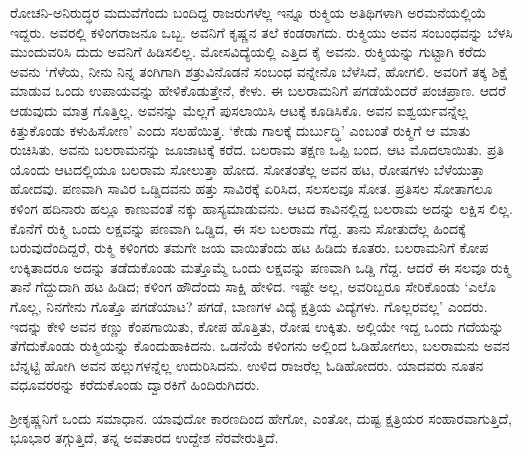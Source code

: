ರೋಚನಿ-ಅನಿರುದ್ಧರ ಮದುವೆಗೆಂದು ಬಂದಿದ್ದ ರಾಜರುಗಳೆಲ್ಲ ಇನ್ನೂ ರುಕ್ಮಿಯ ಅತಿಥಿಗಳಾಗಿ ಅರಮನೆಯಲ್ಲಿಯೆ ಇದ್ದರು. ಅವರಲ್ಲಿ ಕಳಿಂಗರಾಜನೂ ಒಬ್ಬ. ಅವನಿಗೆ ಕೃಷ್ಣನ ತಲೆ ಕಂಡರಾಗದು. ರುಕ್ಮಿಯು ಅವನ ಸಂಬಂಧವನ್ನು ಬೆಳಸಿ ಮುಂದುವರಿಸಿ ದುದು ಅವನಿಗೆ ಹಿಡಿಸಲಿಲ್ಲ. ಮೋಸವಿದ್ಯೆಯಲ್ಲಿ ಎತ್ತಿದ ಕೈ ಅವನು. ರುಕ್ಮಿಯನ್ನು ಗುಟ್ಟಾಗಿ ಕರೆದು ಅವನು ‘ಗೆಳೆಯ, ನೀನು ನಿನ್ನ ತಂಗಿಗಾಗಿ ಶತ್ರುವಿನೊಡನೆ ಸಂಬಂಧ ವನ್ನೇನೊ ಬೆಳೆಸಿದೆ, ಹೋಗಲಿ. ಅವರಿಗೆ ತಕ್ಕ ಶಿಕ್ಷೆ ಮಾಡುವ ಒಂದು ಉಪಾಯವನ್ನು ಹೇಳಿಕೊಡುತ್ತೇನೆ, ಕೇಳು. ಈ ಬಲರಾಮನಿಗೆ ಪಗಡೆಯೆಂದರೆ ಪಂಚಪ್ರಾಣ. ಆದರೆ ಆಡುವುದು ಮಾತ್ರ ಗೊತ್ತಿಲ್ಲ. ಅವನನ್ನು ಮೆಲ್ಲಗೆ ಪುಸಲಾಯಿಸಿ ಆಟಕ್ಕೆ ಕೂಡಿಸಿಕೊ. ಅವನ ಐಶ್ವರ್ಯವನ್ನೆಲ್ಲ ಕಿತ್ತುಕೊಂಡು ಕಳುಹಿಸೋಣ’ ಎಂದು ಸಲಹೆಯಿತ್ತ. ‘ಕೇಡು ಗಾಲಕ್ಕೆ ದುರ್ಬುದ್ಧಿ’ ಎಂಬಂತೆ ರುಕ್ಮಿಗೆ ಆ ಮಾತು ರುಚಿಸಿತು. ಅವನು ಬಲರಾಮನನ್ನು ಜೂಜಾಟಕ್ಕೆ ಕರೆದ. ಬಲರಾಮ ತಕ್ಷಣ ಒಪ್ಪಿ ಬಂದ. ಆಟ ಮೊದಲಾಯಿತು. ಪ್ರತಿ ಯೊಂದು ಆಟದಲ್ಲಿಯೂ ಬಲರಾಮ ಸೋಲುತ್ತಾ ಹೋದ. ಸೋತಂತೆಲ್ಲ ಅವನ ಹಟ, ರೋಷಗಳು ಬೆಳೆಯುತ್ತಾ ಹೋದವು. ಪಣವಾಗಿ ಸಾವಿರ ಒಡ್ಡಿದವನು ಹತ್ತು ಸಾವಿರಕ್ಕೆ ಏರಿಸಿದ, ಸಲಸಲವೂ ಸೋತ. ಪ್ರತಿಸಲ ಸೋತಾಗಲೂ ಕಳಿಂಗ ಹದಿನಾರು ಹಲ್ಲೂ ಕಾಣುವಂತೆ ನಕ್ಕು ಹಾಸ್ಯಮಾಡುವನು. ಆಟದ ಕಾವಿನಲ್ಲಿದ್ದ ಬಲರಾಮ ಅದನ್ನು ಲಕ್ಷಿಸ ಲಿಲ್ಲ. ಕೊನೆಗೆ ರುಕ್ಮಿ ಒಂದು ಲಕ್ಷವನ್ನು ಪಣವಾಗಿ ಒಡ್ಡಿದ, ಈ ಸಲ ಬಲರಾಮ ಗೆದ್ದ. ತಾನು ಸೋತುದೆಲ್ಲ ಹಿಂದಕ್ಕೆ ಬರುವುದೆಂದಿದ್ದರೆ, ರುಕ್ಮಿ ಕಳಿಂಗರು ತಮಗೇ ಜಯ ವಾಯಿತೆಂದು ಹಟ ಹಿಡಿದು ಕೂತರು. ಬಲರಾಮನಿಗೆ ಕೋಪ ಉಕ್ಕಿತಾದರೂ ಅದನ್ನು ತಡೆದುಕೊಂಡು ಮತ್ತೊಮ್ಮೆ ಒಂದು ಲಕ್ಷವನ್ನು ಪಣವಾಗಿ ಒಡ್ಡಿ ಗೆದ್ದ. ಆದರೆ ಈ ಸಲವೂ ರುಕ್ಮಿ ತಾನೆ ಗೆದ್ದುದಾಗಿ ಹಟ ಹಿಡಿದ; ಕಳಿಂಗ ಹೌದೆಂದು ಸಾಕ್ಷಿ ಹೇಳಿದ. ಇಷ್ಟೇ ಅಲ್ಲ, ಅವರಿಬ್ಬರೂ ಸೇರಿಕೊಂಡು ‘ಎಲೊ ಗೊಲ್ಲ, ನಿನಗೇನು ಗೊತ್ತೊ ಪಗಡೆಯಾಟ? ಪಗಡೆ, ಬಾಣಗಳ ವಿದ್ಯೆ ಕ್ಷತ್ರಿಯ ವಿದ್ಯೆಗಳು. ಗೊಲ್ಲರವಲ್ಲ’ ಎಂದರು. ಇದನ್ನು ಕೇಳಿ ಅವನ ಕಣ್ಣು ಕೆಂಪಗಾಯಿತು, ಕೋಪ ಹೊತ್ತಿತು, ರೋಷ ಉಕ್ಕಿತು. ಅಲ್ಲಿಯೇ ಇದ್ದ ಒಂದು ಗದೆಯನ್ನು ತೆಗೆದುಕೊಂಡು ರುಕ್ಮಿಯನ್ನು ಕೊಂದುಹಾಕಿದನು. ಒಡನೆಯೆ ಕಳಿಂಗನು ಅಲ್ಲಿಂದ ಓಡಿಹೋಗಲು, ಬಲರಾಮನು ಅವನ ಬೆನ್ನಟ್ಟಿ ಹೋಗಿ ಅವನ ಹಲ್ಲುಗಳನ್ನೆಲ್ಲ ಉದುರಿಸಿದನು. ಉಳಿದ ರಾಜರೆಲ್ಲ ಓಡಿಹೋದರು. ಯಾದವರು ನೂತನ ವಧೂವರರನ್ನು ಕರೆದುಕೊಂಡು ದ್ವಾರಕಿಗೆ ಹಿಂದಿರುಗಿದರು.

ಶ್ರೀಕೃಷ್ಣನಿಗೆ ಒಂದು ಸಮಾಧಾನ. ಯಾವುದೋ ಕಾರಣದಿಂದ ಹೇಗೋ, ಎಂತೋ, ದುಷ್ಟ ಕ್ಷತ್ರಿಯರ ಸಂಹಾರವಾಗುತ್ತಿದೆ, ಭೂಭಾರ ತಗ್ಗುತ್ತಿದೆ, ತನ್ನ ಅವತಾರದ ಉದ್ದೇಶ ನೆರವೇರುತ್ತಿದೆ.

